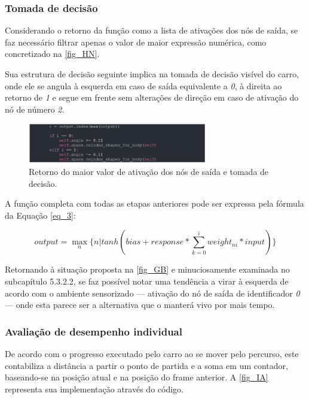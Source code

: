 \subsubsection{Tomada de decisão}
Considerando o retorno da função como a lista de ativações dos nós de saída, se faz necessário filtrar
apenas o valor de maior expressão numérica, como concretizado na \autoref{fig_HN}.

Sua estrutura de decisão seguinte implica na tomada de decisão visível do carro, onde ele se angula
à esquerda em caso de saída equivalente a \textit{0}, à direita ao retorno de \textit{1} e segue em frente sem alterações
de direção em caso de ativação do nó de número \textit{2}.

\begin{figure}[htb]
        \centering
        \caption{\label{fig_HN}Retorno do maior valor de ativação dos nós de saída e tomada de decisão.}
        \includegraphics[width=0.7\textwidth]{images/HN.png}
\end{figure}

A função completa com todas as etapas anteriores pode ser expressa pela fórmula da Equação \ref{eq_3}:

\begin{equation}
\label{eq_3}
output = \max_{n}\{n | tanh(bias + response * \sum_{k=0}^{i} weight_{ni}*input)\}
\end{equation}

Retornando à situação proposta na \autoref{fig_GB} e minuciosamente examinada no subcapítulo 5.3.2.2,
se faz possível notar uma tendência a virar à esquerda de acordo com o ambiente sensorizado —
ativação do nó de saída de identificador \textit{0} — onde esta parece ser a alternativa que o manterá vivo por mais tempo.

\subsubsection{Avaliação de desempenho individual}
De acordo com o progresso executado pelo carro ao se mover pelo percurso, este contabiliza a
distância a partir o ponto de partida e a soma em um contador, baseando-se na posição atual e na
posição do frame anterior. A \autoref{fig_IA} representa sua implementação através do código.

